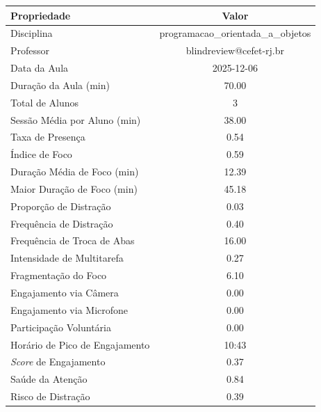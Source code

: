 \begin{table}[H]
    \centering
    \vspace{0.5cm}
    \begin{tabular}{|l|c|}
        \hline
        \textbf{Propriedade} & \textbf{Valor} \\
        \hline
        Disciplina & programacao\_orientada\_a\_objetos \\
        Professor & blindreview@cefet-rj.br \\
        Data da Aula & 2025-12-06 \\
        Duração da Aula (min) & 70.00 \\
        Total de Alunos & 3 \\
        Sessão Média por Aluno (min) & 38.00 \\
        Taxa de Presença & 0.54 \\
        Índice de Foco & 0.59 \\
        Duração Média de Foco (min) & 12.39 \\
        Maior Duração de Foco (min) & 45.18 \\
        Proporção de Distração & 0.03 \\
        Frequência de Distração & 0.40 \\
        Frequência de Troca de Abas & 16.00 \\
        Intensidade de Multitarefa & 0.27 \\
        Fragmentação do Foco & 6.10 \\
        Engajamento via Câmera & 0.00 \\
        Engajamento via Microfone & 0.00 \\
        Participação Voluntária & 0.00 \\
        Horário de Pico de Engajamento & 10:43 \\
        \textit{Score} de Engajamento & 0.37 \\
        Saúde da Atenção & 0.84 \\
        Risco de Distração & 0.39 \\

\end{tabular}
\end{table}
